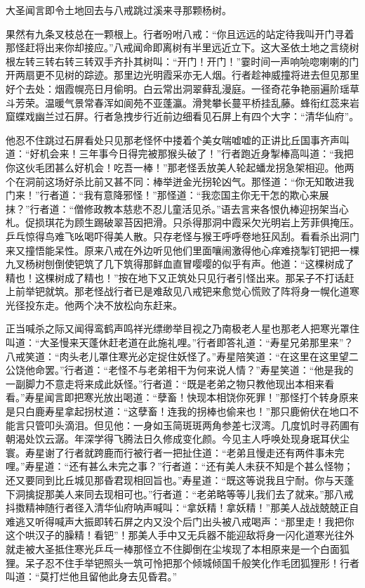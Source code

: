 \documentclass[12pt,UTF8]{ctexbook}
\begin{document}
{	大圣闻言即令土地回去与八戒跳过溪来寻那颗杨树。
	
	果然有九条叉枝总在一颗根上。行者吩咐八戒：“你且远远的站定待我叫开门寻着那怪赶将出来你却接应。”八戒闻命即离树有半里远近立下。这大圣依土地之言绕树根左转三转右转三转双手齐扑其树叫：“开门！开门！”霎时间一声响喨唿喇喇的门开两扇更不见树的踪迹。那里边光明霞采亦无人烟。行者趁神威撞将进去但见那里好个去处：烟霞幌亮日月偷明。白云常出洞翠藓乱漫庭。一径奇花争艳丽遍阶瑶草斗芳荣。温暖气景常春浑如阆苑不亚蓬瀛。滑凳攀长蔓平桥挂乱藤。蜂衔红蕊来岩窟蝶戏幽兰过石屏。行者急拽步行近前边细看见石屏上有四个大字：“清华仙府”。
	
	他忍不住跳过石屏看处只见那老怪怀中搂着个美女喘嘘嘘的正讲比丘国事齐声叫道：“好机会来！三年事今日得完被那猴头破了！”行者跑近身掣棒高叫道：“我把你这伙毛团甚么好机会！吃吾一棒！”那老怪丢放美人轮起蟠龙拐急架相迎。他两个在洞前这场好杀比前又甚不同：棒举迸金光拐轮凶气。那怪道：“你无知敢进我门来！”行者道：“我有意降邪怪！”那怪道：“我恋国主你无干怎的欺心来展抹？”行者道：“僧修政教本慈悲不忍儿童活见杀。”语去言来各恨仇棒迎拐架当心札。促损琪花为顾生踢破翠苔因把滑。只杀得那洞中霞采欠光明岩上芳菲俱掩压。乒乓惊得鸟难飞吆喝吓得美人散。只存老怪与猴王呼呼卷地狂风刮。看看杀出洞门来又撞悟能呆性。原来八戒在外边听见他们里面嚷闹激得他心痒难挠掣钉钯把一棵九叉杨树刨倒使钯筑了几下筑得那鲜血直冒嘤嘤的似乎有声。他道：“这棵树成了精也！这棵树成了精也！”按在地下又正筑处只见行者引怪出来。那呆子不打话赶上前举钯就筑。那老怪战行者已是难敌见八戒钯来愈觉心慌败了阵将身一幌化道寒光径投东走。他两个决不放松向东赶来。
	
	正当喊杀之际又闻得鸾鹤声鸣祥光缥缈举目视之乃南极老人星也那老人把寒光罩住叫道：“大圣慢来天蓬休赶老道在此施礼哩。”行者即答礼道：“寿星兄弟那里来”？八戒笑道：“肉头老儿罩住寒光必定捉住妖怪了。”寿星陪笑道：“在这里在这里望二公饶他命罢。”行者道：“老怪不与老弟相干为何来说人情？”寿星笑道：“他是我的一副脚力不意走将来成此妖怪。”行者道：“既是老弟之物只教他现出本相来看看。”寿星闻言即把寒光放出喝道：“孽畜！快现本相饶你死罪！”那怪打个转身原来是只白鹿寿星拿起拐杖道：“这孽畜！连我的拐棒也偷来也！”那只鹿俯伏在地口不能言只管叩头滴泪。但见他：一身如玉简斑斑两角参差七汊湾。几度饥时寻药圃有朝渴处饮云潺。年深学得飞腾法日久修成变化颜。今见主人呼唤处现身珉耳伏尘寰。寿星谢了行者就跨鹿而行被行者一把扯住道：“老弟且慢走还有两件事未完哩。”寿星道：“还有甚么未完之事？”行者道：“还有美人未获不知是个甚么怪物；还又要同到比丘城见那昏君现相回旨也。”寿星道：“既这等说我且宁耐。你与天蓬下洞擒捉那美人来同去现相可也。”行者道：“老弟略等等儿我们去了就来。”那八戒抖擞精神随行者径入清华仙府呐声喊叫：“拿妖精！拿妖精！”那美人战战兢兢正自难逃又听得喊声大振即转石屏之内又没个后门出头被八戒喝声：“那里走！我把你这个哄汉子的臊精！看钯”！那美人手中又无兵器不能迎敌将身一闪化道寒光往外就走被大圣抵住寒光乒乓一棒那怪立不住脚倒在尘埃现了本相原来是一个白面狐狸。呆子忍不住手举钯照头一筑可怜把那个倾城倾国千般笑化作毛团狐狸形！行者叫道：“莫打烂他且留他此身去见昏君。”
	
}
\end{document}
